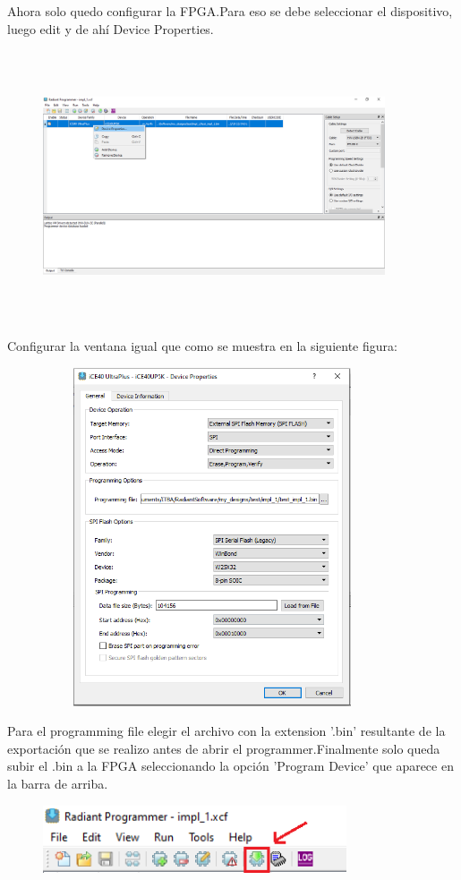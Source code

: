 \documentclass{article}
\begin{document}
Ahora solo quedo configurar la FPGA.Para eso se debe seleccionar el dispositivo, luego edit y de ahí Device Properties.
	\begin{figure}[H]
 	\centering
	\includegraphics[height=8cm, width=0.9\textwidth]{Imagenes/EditProg.png}
	\end{figure}
Configurar la ventana igual que como se muestra en la siguiente figura:
	\begin{figure}[H]
 	\centering
	\includegraphics[height=10cm, width=10cm]{Imagenes/Config.png}
	\end{figure}
Para el programming file elegir el archivo con la extension '.bin' resultante de la exportación que se realizo antes de abrir el programmer.Finalmente solo queda subir el .bin a la FPGA seleccionando la opción 'Program Device' que aparece en la barra de arriba.
	\begin{figure}[H]
 	\centering
	\includegraphics[width=0.8\textwidth]{Imagenes/runprog.png}
	\end{figure}
\end{document}
